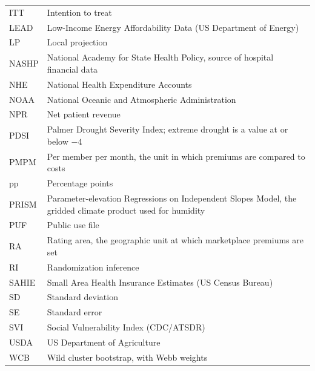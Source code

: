 \begin{longtable}{@{}p{2.4cm}p{12.2cm}@{}}
ITT   & Intention to treat \\
LEAD  & Low-Income Energy Affordability Data (US Department of Energy) \\
LP    & Local projection \\
NASHP & National Academy for State Health Policy, source of hospital financial data \\
NHE   & National Health Expenditure Accounts \\
NOAA  & National Oceanic and Atmospheric Administration \\
NPR   & Net patient revenue \\
PDSI  & Palmer Drought Severity Index; extreme drought is a value at or below $-4$ \\
PMPM  & Per member per month, the unit in which premiums are compared to costs \\
pp    & Percentage points \\
PRISM & Parameter-elevation Regressions on Independent Slopes Model, the gridded climate product used for humidity \\
PUF   & Public use file \\
RA    & Rating area, the geographic unit at which marketplace premiums are set \\
RI    & Randomization inference \\
SAHIE & Small Area Health Insurance Estimates (US Census Bureau) \\
SD    & Standard deviation \\
SE    & Standard error \\
SVI   & Social Vulnerability Index (CDC/ATSDR) \\
USDA  & US Department of Agriculture \\
WCB   & Wild cluster bootstrap, with Webb weights \\
\end{longtable}
\endgroup
